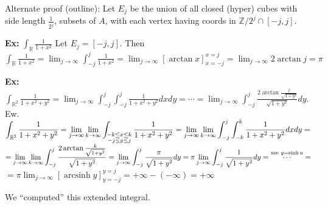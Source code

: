 \documentclass[10pt,letterpaper]{article}
\newcommand{\n}{\hfill\break}
\newcommand{\ex}[1]{\par\noindent\settowidth{\hangindent}{\textbf{Ex: }}\textbf{Ex: }#1\n}
\newcommand{\ptxt}[1]{\textrm{\textnormal{#1}}}
\newcommand{\integers}{\mathbb{Z}}
\newcommand{\Z}{\integers}
\newcommand{\reals}{\mathbb{R}}
\newcommand{\R}{\reals}
\renewcommand{\brack}[1]{\left[#1\right]}
\DeclareMathOperator{\arcsinh}{arcsinh}
\begin{document}
\par\noindent Alternate proof (outline): Let $E_{j}$ be the union of all closed (hyper) cubes with side length $\frac{1}{2^{j}}$, subsets of $A$, with each vertex having coords in $\Z/2^{j}\cap[-j,j]$.\n

\ex{$\displaystyle\int_{\R}\frac{1}{1+x^{2}}$\n
Let $E_{j}=[-j,j]$. Then $\displaystyle\int_{\R}\frac{1}{1+x^{2}}=\lim_{j\to\infty}\int_{-j}^{j}\frac{1}{1+x^{2}}=\lim_{j\to\infty}\brack{\arctan{}x}_{x=-j}^{x=j}=\lim_{j\to\infty}2\arctan{j}=\pi$}

\ex{$\displaystyle\int_{\R^{2}}\frac{1}{1+x^{2}+y^{2}}=\lim_{j\to\infty}\int_{-j}^{j}\int_{-j}^{j}\frac{1}{1+x^{2}+y^{2}}dxdy=\cdots=\lim_{j\to\infty}\int_{-j}^{j}\frac{2\arctan\frac{j}{\sqrt{1+y^{2}}}}{\sqrt{1+y^{2}}}dy$. Ew.\n
$\displaystyle\int_{\R^{2}}\frac{1}{1+x^{2}+y^{2}}=\lim_{j\to\infty}\lim_{k\to\infty}\int_{\begin{subarray}{c}-k\le{}x\le{}k\\ -j\le{}y\le{}j\end{subarray}}\frac{1}{1+x^{2}+y^{2}}=\lim_{j\to\infty}\lim_{k\to\infty}\int_{-j}^{j}\int_{-k}^{k}\frac{1}{1+x^{2}+y^{2}}dxdy=$\n
$\displaystyle=\lim_{j\to\infty}\lim_{k\to\infty}\int_{-j}^{j}\frac{2\arctan\frac{k}{\sqrt{1+y^{2}}}}{\sqrt{1+y^{2}}}=\lim_{j\to\infty}\int_{-j}^{j}\frac{\pi}{\sqrt{1+y^{2}}}dy=\pi\lim_{j\to\infty}\int_{-j}^{j}\frac{1}{\sqrt{1+y^{2}}}dy=\overset{\ptxt{use }y=\sinh{}u}{\cdots}=$\n
$\displaystyle=\pi\lim_{j\to\infty}\brack{\arcsinh{}y}_{y=-j}^{y=j}=+\infty-(-\infty)=+\infty$}

\par\noindent We ``computed'' this extended integral.
\end{document}
